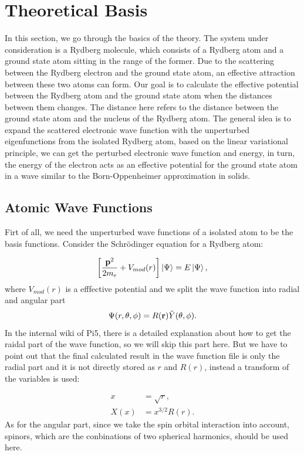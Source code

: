 \documentclass[british,english]{article}
\numberwithin{equation}{section}
\numberwithin{figure}{section}
\begin{document}
\section{Theoretical Basis}

In this section, we go through the basics of the theory. The system
under consideration is a Rydberg molecule, which consists of a Rydberg
atom and a ground state atom sitting in the range of the former. Due
to the scattering between the Rydberg electron and the ground state
atom, an effective attraction between these two atoms can form. Our
goal is to calculate the effective potential between the Rydberg atom
and the ground state atom when the distances between them changes.
The distance here refers to the distance between the ground state
atom and the nucleus of the Rydberg atom. The general idea is to expand
the scattered electronic wave function with the unperturbed eigenfunctions
from the isolated Rydberg atom, based on the linear variational principle,
we can get the perturbed electronic wave function and energy, in turn,
the energy of the electron acts as an effective potential for the
ground state atom in a wave similar to the Born-Oppenheimer approximation
in solids. 

\subsection{Atomic Wave Functions}

Firt of all, we need the unperturbed wave functions of a isolated
atom to be the basis functions. Consider the Schr\"odinger equation
for a Rydberg atom: 

\begin{equation}
\left[\frac{{\bf p}^{2}}{2m_{e}}+V_{mod}(r)\right]\Ket{\Psi}=E\Ket{\Psi},
\end{equation}
where $V_{mod}(r)$ is a efffective potential and we split the wave
function into radial and angular part
\begin{equation}
\Psi(r,\theta,\phi)=R({\bf r})\tilde{Y}(\theta,\phi).
\label{equ:wavefun}
\end{equation}
In the internal wiki of Pi5, there is a detailed explanation about
how to get the raidal part of the wave function, so we will skip this
part here. But we have to point out that the final calculated result
in the wave function file is only the radial part and it is not directly
stored as $r$ and $R(r)$, instead a transform of the variables is
used:

\begin{equation}
\begin{aligned}
x&=\sqrt{r},\\
X(x)&=x^{3/2}R(r).
\label{equ:trans}
\end{aligned}
\end{equation}As for the angular part, since we take the spin orbital interaction
into account, spinors, which are the conbinations of two spherical
harmonics, should be used here.
\end{document}
